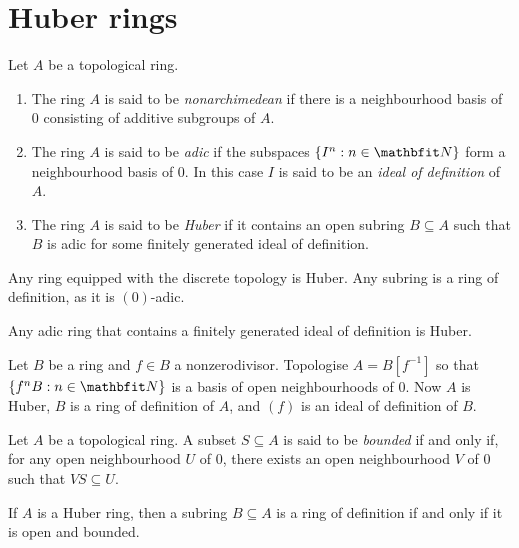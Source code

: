 \section{Huber rings}

\begin{dfn}
	Let $A$ be a topological ring.
	\begin{enumerate}
		\item The ring $A$ is said to be \emph{nonarchimedean} if there is a neighbourhood basis of $0$ consisting of additive subgroups of $A$.
		\item The ring $A$ is said to be \emph{adic} if the subspaces $\{I^n : n \in \NN\}$ form a neighbourhood basis of $0$.
		In this case $I$ is said to be an \emph{ideal of definition} of $A$.
		\item The ring $A$ is said to be \emph{Huber} if it contains an open subring $B \subseteq A$ such that $B$ is adic for some finitely generated ideal of definition.
	\end{enumerate}
\end{dfn}

\begin{exm}
	Any ring equipped with the discrete topology is Huber.
	Any subring is a ring of definition, as it is $(0)$-adic.
\end{exm}

\begin{exm}
	Any adic ring that contains a finitely generated ideal of definition is Huber.
\end{exm}

\begin{exm}
	Let $B$ be a ring and $f \in B$ a nonzerodivisor.
	Topologise $A = B[f^{-1}]$ so that $\{f^nB : n\in \NN\}$ is a basis of open neighbourhoods of $0$.
	Now $A$ is Huber, $B$ is a ring of definition of $A$, and $(f)$ is an ideal of definition of $B$.
\end{exm}

\begin{dfn}
	Let $A$ be a topological ring.
	A subset $S \subseteq A$ is said to be \emph{bounded} if and only if, for any open neighbourhood $U$ of $0$, there exists an open neighbourhood $V$ of $0$ such that $VS \subseteq U$.
\end{dfn}

\begin{lem}
	If $A$ is a Huber ring, then a subring $B \subseteq A$ is a ring of definition if and only if it is open and bounded.
\end{lem}

